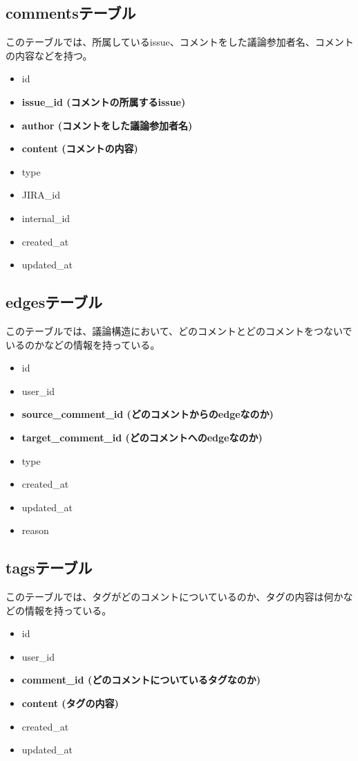 \documentclass[12pt, oneside]{jreport}
\begin{document}
		\subsection{commentsテーブル}
		このテーブルでは、所属しているissue、コメントをした議論参加者名、コメントの内容などを持つ。
		\begin{itemize}
		\item id
		\item {\bf issue\_id (コメントの所属するissue)}
		\item {\bf author (コメントをした議論参加者名)}
		\item {\bf content (コメントの内容)}
		\item type
		\item JIRA\_id
		\item internal\_id
		\item created\_at
		\item updated\_at
		\end{itemize}

		\subsection{edgesテーブル}
		このテーブルでは、議論構造において、どのコメントとどのコメントをつないでいるのかなどの情報を持っている。
		\begin{itemize}
		\item id
		\item user\_id
		\item {\bf source\_comment\_id (どのコメントからのedgeなのか)}
		\item {\bf target\_comment\_id (どのコメントへのedgeなのか)}
		\item type
		\item created\_at
		\item updated\_at
		\item reason
		\end{itemize}
		
		\subsection{tagsテーブル}
		このテーブルでは、タグがどのコメントについているのか、タグの内容は何かなどの情報を持っている。
		\begin{itemize}
		\item id
		\item user\_id
		\item {\bf comment\_id (どのコメントについているタグなのか)}
		\item {\bf content (タグの内容)}
		\item created\_at
		\item updated\_at
		\end{itemize}
\end{document}
